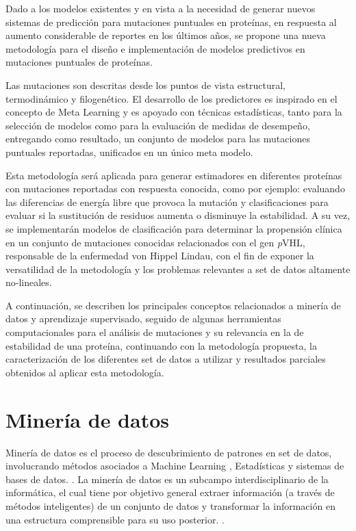 Dado a los modelos existentes y en vista a la necesidad de generar nuevos sistemas de predicción para mutaciones puntuales en proteínas, en respuesta al aumento considerable de reportes en los últimos años, se propone una nueva metodología para el diseño e implementación de modelos predictivos en mutaciones puntuales de proteínas.

Las mutaciones son descritas desde los puntos de vista estructural, termodinámico y filogenético. El desarrollo de los predictores es inspirado en el concepto de Meta Learning y es apoyado con técnicas estadísticas, tanto para la selección de modelos como para la evaluación de medidas de desempeño, entregando como resultado, un conjunto de modelos para las mutaciones puntuales reportadas, unificados en un único meta modelo.

Esta metodología será aplicada para generar estimadores en diferentes proteínas con mutaciones reportadas con respuesta conocida, como por ejemplo: evaluando las diferencias de energía libre que provoca la mutación y clasificaciones para evaluar si la sustitución de residuos aumenta o disminuye la estabilidad. A su vez, se implementarán modelos de clasificación para determinar la propensión clínica en un conjunto de mutaciones conocidas relacionados con el gen \textit{p}VHL, responsable de la enfermedad von Hippel Lindau, con el fin de exponer la versatilidad de la metodología y los problemas relevantes a set de datos altamente no-lineales.

A continuación, se describen los principales conceptos relacionados a minería de datos y aprendizaje supervisado, seguido de algunas herramientas computacionales para el análisis de mutaciones y su relevancia en la de estabilidad de una proteína, continuando con la metodología propuesta, la caracterización de los diferentes set de datos a utilizar y resultados parciales obtenidos al aplicar esta metodología.

\section{Minería de datos}


Minería de datos es el proceso de descubrimiento de patrones en set de datos, involucrando métodos asociados a Machine Learning \cite{michie1994machine}, Estadísticas y sistemas de bases de datos. \cite{hand2006data}. La minería de datos es un subcampo interdisciplinario de la informática, el cual tiene por objetivo general extraer información (a través de métodos inteligentes) de un conjunto de datos y transformar la información en una estructura comprensible para su uso posterior. \cite{fayyad1996knowledge, dunham2006data}. 

